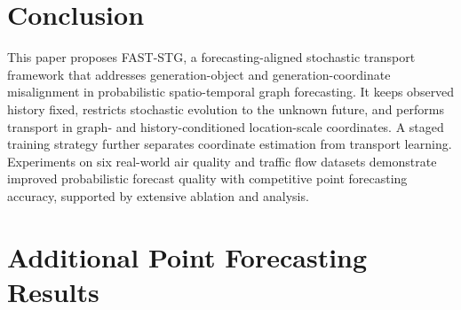 \documentclass[sigconf, anonymous, review]{acmart}
\begin{document}
\begin{table}[h]
\centering
\caption{Inference efficiency comparison on AIR-BJ. All methods are
evaluated under the same hardware and sampling protocol.}
\label{tab:efficiency}
\small
\setlength{\tabcolsep}{4pt}
\end{table}

\section{Conclusion}
\label{sec:conclusion}

This paper proposes FAST-STG, a forecasting-aligned stochastic
transport framework that addresses generation-object and
generation-coordinate misalignment in probabilistic spatio-temporal
graph forecasting. It keeps observed history fixed, restricts stochastic
evolution to the unknown future, and performs transport in graph- and
history-conditioned location-scale coordinates. A staged training strategy further separates coordinate estimation from transport learning. Experiments on six real-world air quality and traffic flow datasets demonstrate improved probabilistic forecast quality with competitive point forecasting accuracy, supported by extensive ablation and analysis.




\clearpage
\appendix

\section{Additional Point Forecasting Results}
\label{app:point_results}
\end{document}
